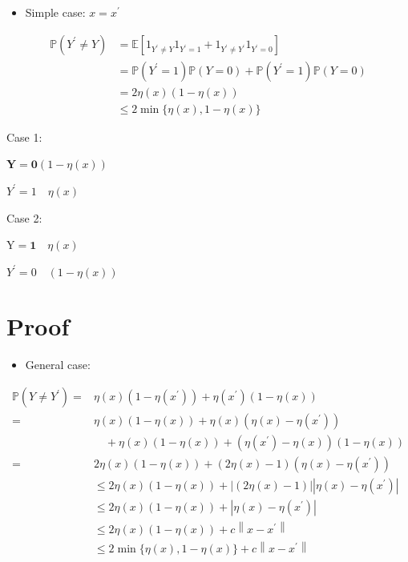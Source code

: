 \documentclass[10pt]{article}
\begin{document}
\begin{itemize}
  \item Simple case: $x=x^{\prime}$
\end{itemize}

$$
\begin{aligned}
\mathbb{P}\left(Y^{\prime} \neq Y\right) & =\mathbb{E}\left[1_{Y^{\prime} \neq Y} 1_{Y^{\prime}=1}+1_{Y^{\prime} \neq Y^{\prime}} 1_{Y^{\prime}=0}\right] \\
& =\mathbb{P}\left(Y^{\prime}=1\right) \mathbb{P}(Y=0)+\mathbb{P}\left(Y^{\prime}=1\right) \mathbb{P}(Y=0) \\
& =2 \eta(x)(1-\eta(x)) \\
& \leq 2 \min \{\eta(x), 1-\eta(x)\}
\end{aligned}
$$

Case 1:

$\mathbf{Y}=\mathbf{0}(1-\eta(x))$

$Y^{\prime}=1 \quad \eta(x)$

Case 2:

$\mathrm{Y}=\mathbf{1} \quad \eta(x)$

$Y^{\prime}=0 \quad(1-\eta(x))$

\section*{Proof}
\begin{itemize}
  \item General case:
\end{itemize}

$$
\begin{aligned}
\mathbb{P}\left(Y \neq Y^{\prime}\right)= & \eta(x)\left(1-\eta\left(x^{\prime}\right)\right)+\eta\left(x^{\prime}\right)(1-\eta(x)) \\
= & \eta(x)(1-\eta(x))+\eta(x)\left(\eta(x)-\eta\left(x^{\prime}\right)\right) \\
& \quad+\eta(x)(1-\eta(x))+\left(\eta\left(x^{\prime}\right)-\eta(x)\right)(1-\eta(x)) \\
= & 2 \eta(x)(1-\eta(x))+(2 \eta(x)-1)\left(\eta(x)-\eta\left(x^{\prime}\right)\right) \\
& \leq 2 \eta(x)(1-\eta(x))+|(2 \eta(x)-1)|\left|\eta(x)-\eta\left(x^{\prime}\right)\right| \\
& \leq 2 \eta(x)(1-\eta(x))+\left|\eta(x)-\eta\left(x^{\prime}\right)\right| \\
& \leq 2 \eta(x)(1-\eta(x))+c\left\|x-x^{\prime}\right\| \\
& \leq 2 \min \{\eta(x), 1-\eta(x)\}+c\left\|x-x^{\prime}\right\|
\end{aligned}
$$
\end{document}
